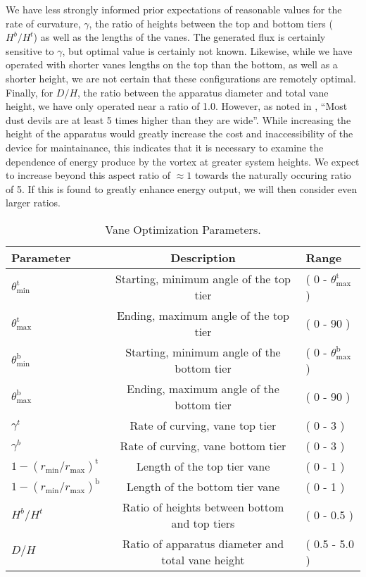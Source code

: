 We have less strongly informed prior expectations of reasonable values
for the rate of curvature, $\gamma$, the ratio of heights between the
top and bottom tiers ($H^b/H^t$) as well as the lengths of the
vanes. The generated flux is certainly sensitive to $\gamma$, but
optimal value is certainly not known. Likewise, while we have operated
with shorter vanes lengths on the top than the bottom, as well as a
shorter height, we are not certain that these configurations are
remotely optimal. Finally, for $D/H$, the ratio between the apparatus
diameter and total vane height, we have only operated near a ratio of
1.0. However, as noted in \cite{ROG:ROG1635}, ``Most dust devils are at 
least 5 times higher than they are wide''. While increasing the height
of the apparatus would greatly increase the cost and inaccessibility of
the device for maintainance, this indicates that it is necessary to
examine the dependence of energy produce by the vortex at greater system
heights. We expect to increase beyond this aspect ratio of $\approx 1$
towards the naturally occuring ratio of 5. If this is found to greatly
enhance energy output, we will then consider even larger ratios. 

%
%
\large
\begin{center}
\begin{table}[h]
 \centering
  \begin{tabular}{| l | c | l |}
    \hline
    Parameter & Description & Range \\
    \hline
    $\theta^{\text{t}}_{\text{min}}$ & Starting, minimum angle of the
       top tier & ( 0 - $\theta^{\text{t}}_{\text{max}}$ ) \\
    $\theta^{\text{t}}_{\text{max}}$ & Ending, maximum angle of the top
       tier & ( 0 - 90 ) \\
    $\theta^{\text{b}}_{\text{min}}$ & Starting, minimum angle of the
       bottom tier & ( 0 - $\theta^{\text{b}}_{\text{max}}$ ) \\
    $\theta^{\text{b}}_{\text{max}}$ & Ending, maximum angle of the
       bottom tier & ( 0 - 90 ) \\
   $\gamma^t$ & Rate of curving, vane top tier & ( 0 - 3 ) \\
   $\gamma^b$ & Rate of curving, vane bottom tier & ( 0 - 3 ) \\
   $1 - (r_{\text{min}} / r_{\text{max}})^{\text{t}}$ & Length of the top
       tier vane & ( 0 - 1 ) \\
   $1 - (r_{\text{min}} / r_{\text{max}})^{\text{b}}$ & Length of the
       bottom 
       tier vane & ( 0 - 1 ) \\
   $H^b/H^t$ & Ratio of heights between bottom and top tiers & ( 0 -
	   0.5 ) \\ 
   $D/H$ & Ratio of apparatus diameter and total vane height & ( 0.5 -
	   5.0 ) \\ 
    \hline
  \end{tabular}
  \caption{Vane Optimization Parameters.}
  \label{tab:vane}
\end{table}
\end{center}
\normalsize

